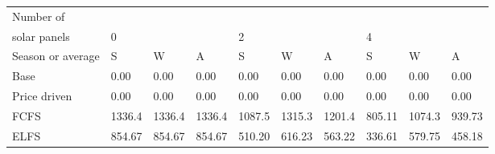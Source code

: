 \begin{table}[h] 
\centering 
\begin{tabular}{l|lll|lll|lll}Number of \\ solar panels&0& & &2& & &4& & \\ \hline 
Season or average & S & W & A & S & W & A & S & W & A \\ \hline 
Base&0.00&0.00&0.00&0.00&0.00&0.00&0.00&0.00&0.00 \\ 
Price driven&0.00&0.00&0.00&0.00&0.00&0.00&0.00&0.00&0.00 \\ 
FCFS&1336.4&1336.4&1336.4&1087.5&1315.3&1201.4&805.11&1074.3&939.73 \\ 
ELFS&854.67&854.67&854.67&510.20&616.23&563.22&336.61&579.75&458.18 \\ 
\end{tabular} 
\end{table}